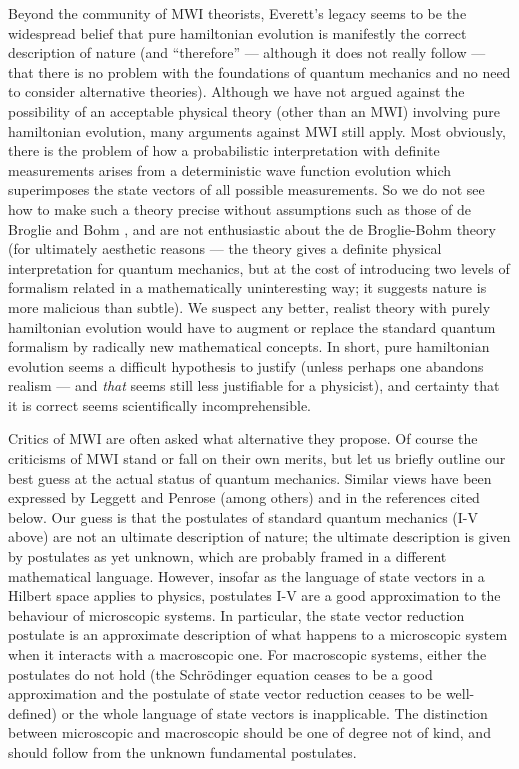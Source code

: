 \documentclass[aps,pra,12pt]{revtex4}
\begin{document}
Beyond the community of MWI theorists, Everett's legacy seems to be
the widespread belief that pure hamiltonian evolution is manifestly
the correct description of nature (and ``therefore'' --- although it
does not really follow --- that there is no problem with the foundations
of quantum mechanics and no need to consider alternative theories). 
Although we have not argued against the possibility of an acceptable physical
theory (other than an MWI)
involving pure hamiltonian evolution, many arguments against MWI still
apply. Most obviously, there is the problem of how a probabilistic 
interpretation with definite measurements arises from a deterministic
wave function evolution which superimposes the state vectors of all possible
measurements. 
So we do not see how to make such a theory precise without assumptions such as
those of de Broglie \cite{db} and Bohm \cite{bohm},  and are
not enthusiastic about the de Broglie-Bohm theory (for ultimately
aesthetic reasons --- the theory gives a definite 
physical interpretation for quantum mechanics,
but at the cost of introducing two levels of formalism related
in a mathematically uninteresting way; it suggests nature is
more malicious than subtle).  We suspect any better, realist theory
with purely hamiltonian evolution would have to augment or replace the
standard quantum formalism by radically new mathematical concepts.
In short, pure hamiltonian evolution seems a difficult hypothesis to
justify (unless perhaps one abandons realism --- and {\em that} seems
still less justifiable for a physicist), 
and certainty that it is correct seems 
scientifically incomprehensible.

Critics of MWI are often asked what alternative they propose.   
Of course the criticisms of MWI stand or fall
on their own merits, but let us briefly outline our best guess at the
actual status of quantum mechanics. 
Similar views have been expressed by Leggett \cite{leggett} and 
Penrose \cite{penrose} (among others) and in the references cited below. 
Our guess is that the postulates of standard quantum mechanics (I-V above)
are not an ultimate description of nature; the ultimate description is
given by postulates as yet unknown, which are probably framed in a
different mathematical language.
However, insofar as the language of state vectors in a Hilbert space applies
to physics, postulates I-V are a good approximation to the behaviour of 
microscopic systems. In particular, the state vector reduction postulate
is an approximate description of what happens to a microscopic
system when it interacts with a macroscopic one. 
For macroscopic systems, either the postulates do not
hold (the Schr\"{o}dinger equation ceases to be a good approximation and 
the postulate of state vector reduction ceases to be well-defined)
or the whole language of state vectors is inapplicable.  
The distinction between microscopic and macroscopic should be one of degree
not of kind, and should follow from the unknown fundamental postulates. 
\end{document}

